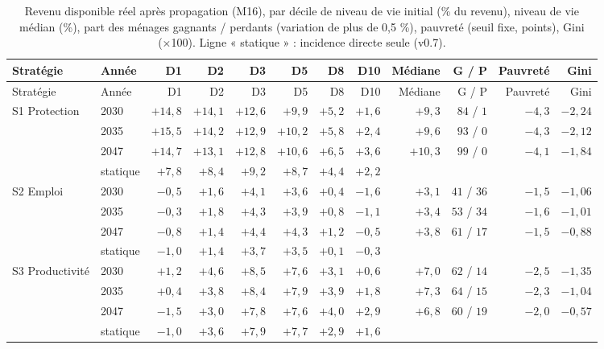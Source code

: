 \begin{longtable}{llrrrrrrrrrr}\caption{Revenu disponible réel après propagation (M16), par décile de niveau de vie initial (\% du revenu), niveau de vie médian (\%), part des ménages gagnants / perdants (variation de plus de 0,5 \%), pauvreté (seuil fixe, points), Gini (×100). Ligne « statique » : incidence directe seule (v0.7).}\label{tab:distrib}\\ \toprule Stratégie & Année & D1 & D2 & D3 & D5 & D8 & D10 & Médiane & G / P & Pauvreté & Gini\\ \midrule\endfirsthead\toprule Stratégie & Année & D1 & D2 & D3 & D5 & D8 & D10 & Médiane & G / P & Pauvreté & Gini\\ \midrule\endhead
S1 Protection & 2030 & $+14{,}8$ & $+14{,}1$ & $+12{,}6$ & $+9{,}9$ & $+5{,}2$ & $+1{,}6$ & $+9{,}3$ & $84$ / $1$ & $-4{,}3$ & $-2{,}24$\\
 & 2035 & $+15{,}5$ & $+14{,}2$ & $+12{,}9$ & $+10{,}2$ & $+5{,}8$ & $+2{,}4$ & $+9{,}6$ & $93$ / $0$ & $-4{,}3$ & $-2{,}12$\\
 & 2047 & $+14{,}7$ & $+13{,}1$ & $+12{,}8$ & $+10{,}6$ & $+6{,}5$ & $+3{,}6$ & $+10{,}3$ & $99$ / $0$ & $-4{,}1$ & $-1{,}84$\\
 & statique & $+7{,}8$ & $+8{,}4$ & $+9{,}2$ & $+8{,}7$ & $+4{,}4$ & $+2{,}2$ & & & & \\
\addlinespace
S2 Emploi & 2030 & $-0{,}5$ & $+1{,}6$ & $+4{,}1$ & $+3{,}6$ & $+0{,}4$ & $-1{,}6$ & $+3{,}1$ & $41$ / $36$ & $-1{,}5$ & $-1{,}06$\\
 & 2035 & $-0{,}3$ & $+1{,}8$ & $+4{,}3$ & $+3{,}9$ & $+0{,}8$ & $-1{,}1$ & $+3{,}4$ & $53$ / $34$ & $-1{,}6$ & $-1{,}01$\\
 & 2047 & $-0{,}8$ & $+1{,}4$ & $+4{,}4$ & $+4{,}3$ & $+1{,}2$ & $-0{,}5$ & $+3{,}8$ & $61$ / $17$ & $-1{,}5$ & $-0{,}88$\\
 & statique & $-1{,}0$ & $+1{,}4$ & $+3{,}7$ & $+3{,}5$ & $+0{,}1$ & $-0{,}3$ & & & & \\
\addlinespace
S3 Productivité & 2030 & $+1{,}2$ & $+4{,}6$ & $+8{,}5$ & $+7{,}6$ & $+3{,}1$ & $+0{,}6$ & $+7{,}0$ & $62$ / $14$ & $-2{,}5$ & $-1{,}35$\\
 & 2035 & $+0{,}4$ & $+3{,}8$ & $+8{,}4$ & $+7{,}9$ & $+3{,}9$ & $+1{,}8$ & $+7{,}3$ & $64$ / $15$ & $-2{,}3$ & $-1{,}04$\\
 & 2047 & $-1{,}5$ & $+3{,}0$ & $+7{,}8$ & $+7{,}6$ & $+4{,}0$ & $+2{,}9$ & $+6{,}8$ & $60$ / $19$ & $-2{,}0$ & $-0{,}57$\\
 & statique & $-1{,}0$ & $+3{,}6$ & $+7{,}9$ & $+7{,}7$ & $+2{,}9$ & $+1{,}6$ & & & & \\

\end{longtable}
